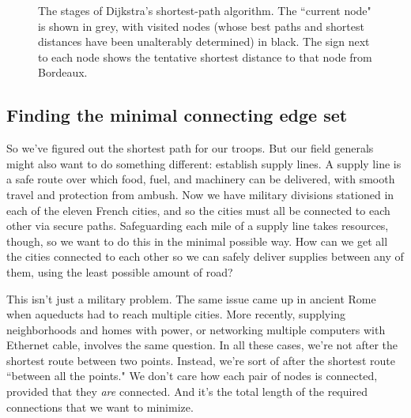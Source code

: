 \begin{figure}[ht]
\begin{custommargins}{-2.4cm}{-2.8cm}
{{
    }
  }

\caption{The stages of Dijkstra's shortest-path algorithm. The ``current
node" is shown in grey, with visited nodes (whose best paths and shortest
distances have been unalterably determined) in black. The sign next to
each node shows the tentative shortest distance to that node from
Bordeaux.}
\label{fig:dijkstra}
\end{custommargins}
\end{figure}

\subsection{Finding the minimal connecting edge set}

So we've figured out the shortest path for our troops. But our field
generals might also want to do something different: establish supply lines.
A supply line is a safe route over which food, fuel, and machinery can be
delivered, with smooth travel and protection from ambush. Now we have
military divisions stationed in each of the eleven French cities, and so
the cities must all be connected to each other via secure paths.
Safeguarding each mile of a supply line takes resources, though, so we want
to do this in the minimal possible way. How can we get all the cities
connected to each other so we can safely deliver supplies between any of
them, using the least possible amount of road?

This isn't just a military problem. The same issue came up in ancient Rome
when aqueducts had to reach multiple cities. More recently, supplying
neighborhoods and homes with power, or networking multiple computers with
Ethernet cable, involves the same question. In all these cases, we're not
after the shortest route between two points. Instead, we're sort of after
the shortest route ``between all the points." We don't care how each pair
of nodes is connected, provided that they \textit{are} connected. And it's
the total length of the required connections that we want to minimize.

